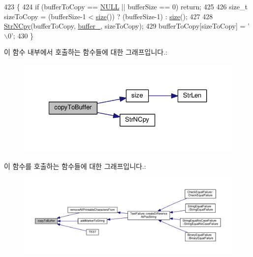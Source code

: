 \begin{DoxyCode}
423 \{
424     \textcolor{keywordflow}{if} (bufferToCopy == \hyperlink{openavb__types__base__pub_8h_a070d2ce7b6bb7e5c05602aa8c308d0c4}{NULL} || bufferSize == 0) \textcolor{keywordflow}{return};
425 
426     \textcolor{keywordtype}{size\_t} sizeToCopy = (bufferSize-1 < \hyperlink{class_simple_string_aac782da1f912bceb5d8ad00c8dc892ac}{size}()) ? (bufferSize-1) : \hyperlink{class_simple_string_aac782da1f912bceb5d8ad00c8dc892ac}{size}();
427 
428     \hyperlink{class_simple_string_a441975b120170a5cf9662de1330e2bf4}{StrNCpy}(bufferToCopy, \hyperlink{class_simple_string_a37525d5cfe40669bc9ca14b3234c70d2}{buffer\_}, sizeToCopy);
429     bufferToCopy[sizeToCopy] = \textcolor{charliteral}{'\(\backslash\)0'};
430 \}
\end{DoxyCode}


이 함수 내부에서 호출하는 함수들에 대한 그래프입니다.\+:
\nopagebreak
\begin{figure}[H]
\begin{center}
\leavevmode
\includegraphics[width=327pt]{class_simple_string_af834204c528ec23e5b39fbeb9a991144_cgraph}
\end{center}
\end{figure}




이 함수를 호출하는 함수들에 대한 그래프입니다.\+:
\nopagebreak
\begin{figure}[H]
\begin{center}
\leavevmode
\includegraphics[width=350pt]{class_simple_string_af834204c528ec23e5b39fbeb9a991144_icgraph}
\end{center}
\end{figure}



